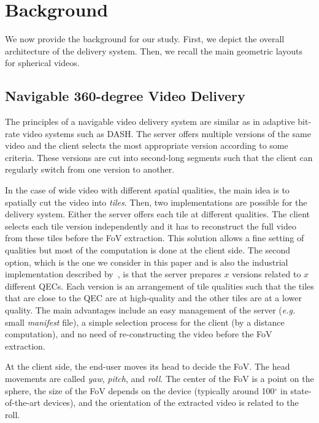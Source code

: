 \section{Background}

We now provide the background for our study.
First, we depict the overall architecture of the delivery system.
Then, we recall the main geometric layouts for spherical videos.

\subsection{Navigable 360-degree Video Delivery}

The principles of a navigable video delivery system are similar as in adaptive bit-rate
video systems such as \ac{DASH}. The server offers multiple versions of the same video 
and the client
selects the most appropriate version according to some criteria. These versions 
are cut into second-long segments such that the client can regularly switch from one 
version to another.

In the case of wide video with different spatial qualities, the main idea is to spatially cut 
the video into \emph{tiles}.
Then, two implementations are possible for the delivery system. Either the server 
offers each tile at different qualities. The client selects each tile version independently 
and it has to reconstruct
the full video from these tiles before the \ac{FoV} extraction. This solution allows a 
fine setting of qualities but 
most of the computation is done at the client side. The second option, 
which is the one we consider in this paper and is also the industrial implementation described 
by~\citet{facebook}, is that
the server prepares $x$ versions related to $x$ different \acp{QEC}. Each version 
is an arrangement of tile
qualities such that the tiles that are close to the \ac{QEC} are at high-quality 
and the other tiles
are at a lower quality. The main advantages include an easy management of the server 
(\textit{e.g.} small \emph{manifest} file), a simple selection process for the client (by
a distance computation), and no need of re-constructing the video before the \ac{FoV} extraction.

At the client side, the end-user moves its head to decide the \ac{FoV}. The head movements
are called \emph{yaw}, \emph{pitch}, and \emph{roll}. The center of the \ac{FoV} is a 
point on the sphere, the size of the \ac{FoV} depends on the device (typically
around 100$^\circ$ in state-of-the-art devices), and the orientation of the extracted video 
is related to the roll.

